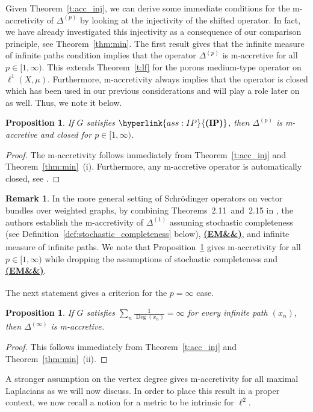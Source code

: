 \documentclass[letterpaper]{article}
\newtheorem{proposition}[lemma]{Proposition}
\theoremstyle{definition}
\newtheorem{remark}[lemma]{Remark}
\theoremstyle{named}
\numberwithin{equation}{section}
\newcommand{\IP}{\hyperlink{ass:IP}{\textup{\textbf{(IP)}}}}
\newcommand{\EM}[1][]{\hyperlink{ass:EM}{\textup{\textbf{(EM\ifx&#1&\else\textsubscript{#1}\fi)}}}}
\newcommand{\Deg}{\operatorname{Deg}}
\newcommand{\Dep}{\Delta^{(p)}}
\begin{document}
Given Theorem~\ref{t:acc_inj}, we can derive some immediate conditions for the
m-accretivity of $\Dep$ by looking at the injectivity
of the shifted operator. In fact, we have already investigated this injectivity as a consequence
of our comparison principle, see Theorem~\ref{thm:min}.
The first result gives that the infinite measure of infinite paths condition implies that the operator $\Delta^{(p)}$
is m-accretive for all $p \in [1,\infty)$. This extends Theorem~\ref{t:lf} for the porous medium-type operator
on $\ell^1(X,\mu)$. Furthermore, m-accretivity always implies that the operator is closed 
which has been used in our previous considerations and will play a role later on as well.
Thus, we note it below.
\begin{proposition}\label{p:Lap_accretive}
If $G$ satisfies $\IP$, then
$\Delta^{(p)}$ is 
m-accretive and closed for $p \in [1,\infty)$.
\end{proposition}
\begin{proof}
The m-accretivity follows immediately from Theorem~\ref{t:acc_inj} and Theorem~\ref{thm:min}~(i).
Furthermore, any m-accretive operator
is automatically closed, see \cite[III.~Proposition~3.4]{barbu2010nonlinear}. 
\end{proof}

\begin{remark} 
In the more general setting of Schrödinger operators on vector bundles over weighted graphs, 
by combining Theorems~2.11~and~2.15 in \cite{milatovic2015maximal}, the
authors establish the m-accretivity of $\Delta^{(1)}$
assuming stochastic completeness (see Definition~\ref{def:stochastic_completeness} below), 
\EM, and infinite measure of infinite
paths. We note that Proposition~\ref{p:Lap_accretive} 
gives m-accretivity for all $p\in[1,\infty)$ while dropping the assumptions of stochastic completeness
and \EM.
\end{remark}

The next statement gives a criterion for the $p=\infty$ case.

\begin{proposition}\label{p:Lap_accretive2}
If $G$ satisfies $\sum_{n} \frac{1}{\Deg(x_{n})}=\infty$ for every infinite path $(x_n)$, then
$\Delta^{(\infty)}$ is m-accretive.
\end{proposition}
\begin{proof}
    This follows immediately from Theorem~\ref{t:acc_inj} and Theorem~\ref{thm:min}~(ii).
\end{proof}


A stronger assumption on the vertex degree gives m-accretivity for
all maximal Laplacians as we will now discuss.
In order to place this result in a proper context, we now recall a notion
for a metric to be intrinsic for $\ell^2$.
\end{document}
